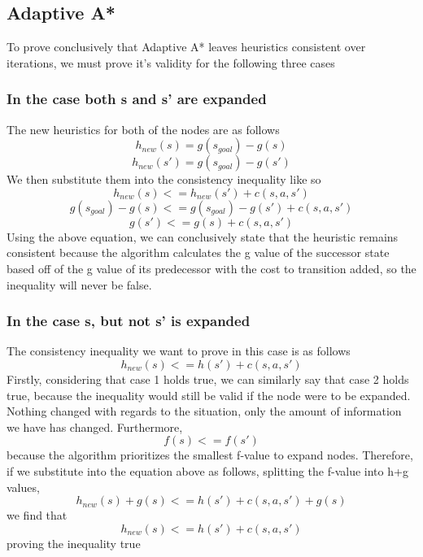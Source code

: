 \documentclass{article}
\begin{document}
\subsection{Adaptive A*}
To prove conclusively that Adaptive A* leaves heuristics consistent over iterations, we must prove it's validity for the following three cases
\subsubsection{In the case both s and s' are expanded}
The new heuristics for both of the nodes are as follows
\begin{equation}
h_{new}(s) = g(s_{goal})-g(s)
\end{equation}
\begin{equation}
h_{new}(s') = g(s_{goal})-g(s')
\end{equation}
We then substitute them into the consistency inequality like so
\begin{equation}
h_{new}(s) <= h_{new}(s')+c(s,a,s')
\end{equation}
\begin{equation}
g(s_{goal}) - g(s) <= g(s_{goal}) - g(s') + c(s,a,s')
\end{equation}
\begin{equation}
g(s') <= g(s) + c(s,a,s')
\end{equation}
Using the above equation, we can conclusively state that the heuristic remains consistent because the algorithm calculates the g value of the successor state based off of the g value of its predecessor with the cost to transition added, so the inequality will never be false.
\subsubsection{In the case s, but not s' is expanded}
The consistency inequality we want to prove in this case is as follows
\begin{equation}
h_{new}(s) <= h(s') + c(s,a,s')
\end{equation}
Firstly, considering that case 1 holds true, we can similarly say that case 2 holds true, because the inequality would still be valid if the node were to be expanded. Nothing changed with regards to the situation, only the amount of information we have has changed. 
Furthermore,
\begin{equation}
f(s) <= f(s')
\end{equation}
because the algorithm prioritizes the smallest f-value to expand nodes. Therefore, if we substitute into the equation above as follows, splitting the f-value into h+g values,
\begin{equation}
	h_{new}(s) + g(s) <= h(s') + c(s,a,s') + g(s)
\end{equation}
we find that 
\begin{equation}
h_{new}(s) <= h(s') + c(s,a,s')
\end{equation}
proving the inequality true
\end{document}
